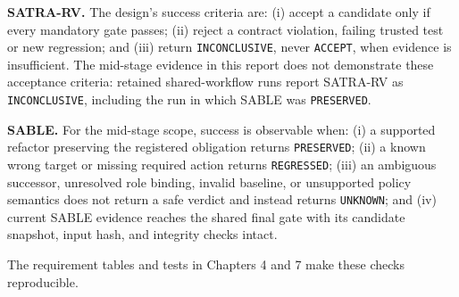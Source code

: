 \begin{sloppypar}
\textbf{SATRA-RV.} The design's success criteria are: (i) accept a candidate only if every mandatory gate passes; (ii) reject a contract violation, failing trusted test or new regression; and (iii) return \texttt{INCONCLUSIVE}, never \texttt{ACCEPT}, when evidence is insufficient. The mid-stage evidence in this report does not demonstrate these acceptance criteria: retained shared-workflow runs report SATRA-RV as \texttt{INCONCLUSIVE}, including the run in which SABLE was \texttt{PRESERVED}.
\end{sloppypar}

\begin{sloppypar}
\textbf{SABLE.} For the mid-stage scope, success is observable when: (i) a supported refactor preserving the registered obligation returns \texttt{PRESERVED}; (ii) a known wrong target or missing required action returns \texttt{REGRESSED}; (iii) an ambiguous successor, unresolved role binding, invalid baseline, or unsupported policy semantics does not return a safe verdict and instead returns \texttt{UNKNOWN}; and (iv) current SABLE evidence reaches the shared final gate with its candidate snapshot, input hash, and integrity checks intact.
\end{sloppypar}

The requirement tables and tests in Chapters 4 and 7 make these checks reproducible.

